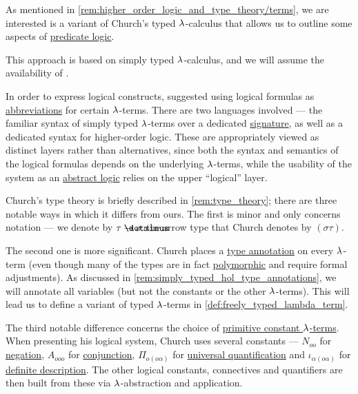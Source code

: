 \begin{remark}\label{rem:simply_typed_hol}
  As mentioned in \cref{rem:higher_order_logic_and_type_theory/terms}, we are interested is a variant of Church's typed \( {\mathrm \lambda} \)-calculus that allows us to outline some aspects of \hyperref[rem:predicate_logic]{predicate logic}.

  This approach is based on simply typed \( {\mathrm \lambda} \)-calculus, and we will assume the availability of .

  In order to express logical constructs,  suggested using logical formulas as \hyperref[con:metalingual_abbreviation]{abbreviations} for certain \( {\mathrm \lambda} \)-terms. There are two languages involved --- the familiar syntax of simply typed \( {\mathrm \lambda} \)-terms over a dedicated \hyperref[def:simple_type_signature]{signature}, as well as a dedicated syntax for higher-order logic. These are appropriately viewed as distinct layers rather than alternatives, since both the syntax and semantics of the logical formulas depends on the underlying \( {\mathrm \lambda} \)-terms, while the usability of the system as an \hyperref[def:abstract_logic]{abstract logic} relies on the upper \enquote{logical} layer.

  Church's type theory is briefly described in \cref{rem:type_theory}; there are three notable ways in which it differs from ours. The first is minor and only concerns notation --- we denote by \( \tau \synimplies \sigma \) the arrow type that Church denotes by \( (\sigma\tau) \).

  The second one is more significant. Church places a \hyperref[con:type_annotation]{type annotation} on every \( {\mathrm \lambda} \)-term (even though many of the types are in fact \hyperref[def:polymorphic_typed_lambda_calculus]{polymorphic} and require formal adjustments). As discussed in \cref{rem:simply_typed_hol_type_annotations}, we will annotate all variables (but not the constants or the other \( {\mathrm \lambda} \)-terms). This will lead us to define a variant of typed \( {\mathrm \lambda} \)-terms in \cref{def:freely_typed_lambda_term}.

  The third notable difference concerns the choice of \hyperref[con:primitive_notion]{primitive constant \( {\mathrm \lambda} \)-terms}. When presenting his logical system, Church uses several constants --- \( N_{oo} \) for \hyperref[def:propositional_alphabet/negation]{negation}, \( A_{ooo} \) for \hyperref[def:propositional_alphabet/connectives/conjunction]{conjunction}, \( \Pi_{o(o\alpha)} \) for \hyperref[def:predicate_logic_alphabet/quantifiers/universal]{universal quantification} and \( \iota_{\alpha(o\alpha)} \) for \hyperref[con:description_operator/iota]{definite description}. The other logical constants, connectives and quantifiers are then built from these via \( {\mathrm \lambda} \)-abstraction and application.


\end{remark}
